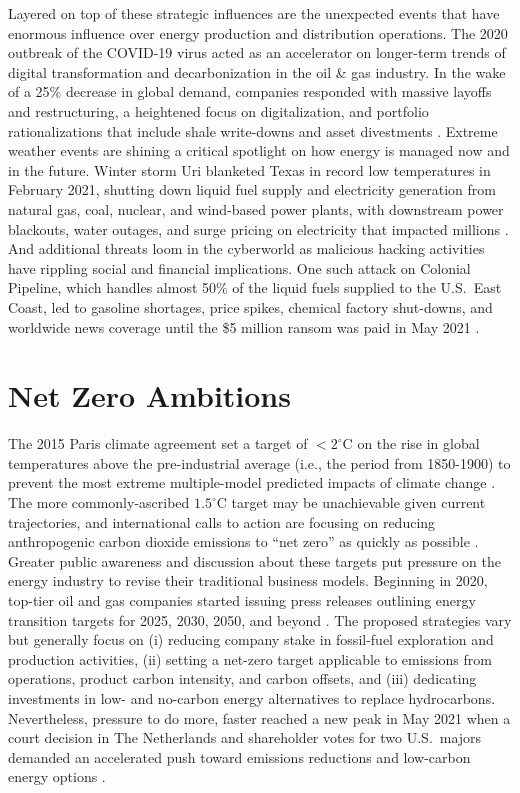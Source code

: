 Layered on top of these strategic influences are the unexpected events that have enormous influence over energy production and distribution operations. The 2020 outbreak of the COVID-19 virus acted as an accelerator on longer-term trends of digital transformation and decarbonization in the oil \& gas industry. In the wake of a 25\% decrease in global demand, companies responded with massive layoffs and restructuring, a heightened focus on digitalization, and portfolio rationalizations that include shale write-downs and asset divestments \citep{deloitte_2021_2020}. Extreme weather events are shining a critical spotlight on how energy is managed now and in the future. Winter storm Uri blanketed Texas in record low temperatures in February 2021, shutting down liquid fuel supply and electricity generation from natural gas, coal, nuclear, and wind-based power plants, with downstream power blackouts, water outages, and surge pricing on electricity that impacted millions \citep{harc_winter_2021,lazard_lazards_2020}. And additional threats loom in the cyberworld as malicious hacking activities have rippling social and financial implications. One such attack on Colonial Pipeline, which handles almost 50\% of the liquid fuels supplied to the U.S.\ East Coast, led to gasoline shortages, price spikes, chemical factory shut-downs, and worldwide news coverage until the \$5 million ransom was paid in May 2021 \citep{sanger_pipeline_2021}.

\section{Net Zero Ambitions}\label{ch1:netzero}
The 2015 Paris climate agreement set a target of $<2^\circ$C on the rise in global temperatures above the pre-industrial average (i.e., the period from 1850-1900) to prevent the most extreme multiple-model predicted impacts of climate change \citep{unfccc_paris_2015}. The more commonly-ascribed $1.5^\circ$C target may be unachievable given current trajectories, and international calls to action are focusing on reducing anthropogenic carbon dioxide emissions to ``net zero'' as quickly as possible \citep{ipcc_global_2018}. Greater public awareness and discussion about these targets put pressure on the energy industry to revise their traditional business models. Beginning in 2020, top-tier oil and gas companies started issuing press releases outlining energy transition targets for 2025, 2030, 2050, and beyond \citep{bp_international_2020,chevron_chevron_2021,conocophillips_conocophillips_2020,equinor_equinor_2020,exxonmobil_exxonmobil_2021,shell_responsible_2020,shell_shell_2021,total_total_2020,total_2020_2021}. The proposed strategies vary but generally focus on (i) reducing company stake in fossil-fuel exploration and production activities, (ii) setting a net-zero target applicable to emissions from operations, product carbon intensity, and carbon offsets, and (iii) dedicating investments in low- and no-carbon energy alternatives to replace hydrocarbons. Nevertheless, pressure to do more, faster reached a new peak in May 2021 when a court decision in The Netherlands and shareholder votes for two U.S.\ majors demanded an accelerated push toward emissions reductions and low-carbon energy options \citep{mcwilliams_investors_2021}.

